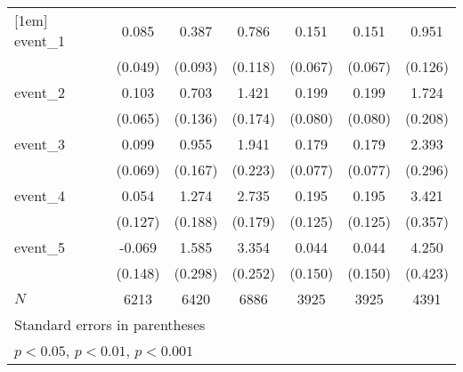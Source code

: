 {\begin{tabular}{l*{6}{c}}
[1em]
event\_1     &       0.085         &       0.387\sym{***}&       0.786\sym{***}&       0.151\sym{*}  &       0.151\sym{*}  &       0.951\sym{***}\\
            &     (0.049)         &     (0.093)         &     (0.118)         &     (0.067)         &     (0.067)         &     (0.126)         \\
[1em]
event\_2     &       0.103         &       0.703\sym{***}&       1.421\sym{***}&       0.199\sym{*}  &       0.199\sym{*}  &       1.724\sym{***}\\
            &     (0.065)         &     (0.136)         &     (0.174)         &     (0.080)         &     (0.080)         &     (0.208)         \\
[1em]
event\_3     &       0.099         &       0.955\sym{***}&       1.941\sym{***}&       0.179\sym{*}  &       0.179\sym{*}  &       2.393\sym{***}\\
            &     (0.069)         &     (0.167)         &     (0.223)         &     (0.077)         &     (0.077)         &     (0.296)         \\
[1em]
event\_4     &       0.054         &       1.274\sym{***}&       2.735\sym{***}&       0.195         &       0.195         &       3.421\sym{***}\\
            &     (0.127)         &     (0.188)         &     (0.179)         &     (0.125)         &     (0.125)         &     (0.357)         \\
[1em]
event\_5     &      -0.069         &       1.585\sym{***}&       3.354\sym{***}&       0.044         &       0.044         &       4.250\sym{***}\\
            &     (0.148)         &     (0.298)         &     (0.252)         &     (0.150)         &     (0.150)         &     (0.423)         \\
\hline
\(N\)       &        6213         &        6420         &        6886         &        3925         &        3925         &        4391         \\
\hline\hline
\multicolumn{7}{l}{\footnotesize Standard errors in parentheses}\\
\multicolumn{7}{l}{\footnotesize \sym{*} \(p<0.05\), \sym{**} \(p<0.01\), \sym{***} \(p<0.001\)}\\
\end{tabular}
}

